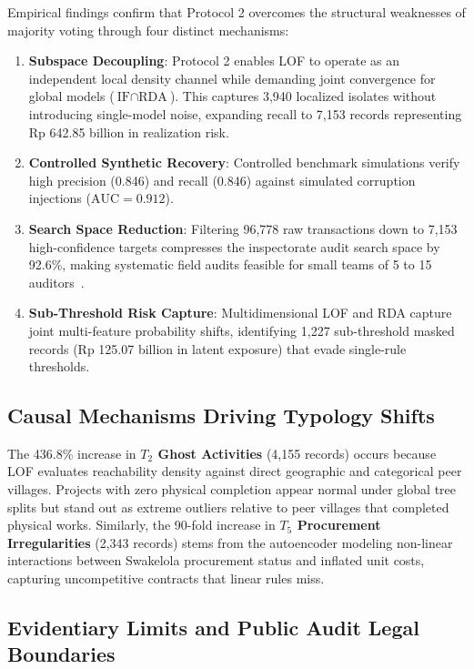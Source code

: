 \documentclass[conference]{IEEEtran}
\begin{document}
Empirical findings confirm that Protocol 2 overcomes the structural weaknesses of majority voting through four distinct mechanisms:
\begin{enumerate}
    \item \textbf{Subspace Decoupling}: Protocol 2 enables LOF to operate as an independent local density channel while demanding joint convergence for global models ($\text{IF} \cap \text{RDA}$). This captures 3,940 localized isolates without introducing single-model noise, expanding recall to 7,153 records representing Rp 642.85 billion in realization risk.
    \item \textbf{Controlled Synthetic Recovery}: Controlled benchmark simulations verify high precision (0.846) and recall (0.846) against simulated corruption injections ($\text{AUC} = 0.912$).
    \item \textbf{Search Space Reduction}: Filtering 96,778 raw transactions down to 7,153 high-confidence targets compresses the inspectorate audit search space by 92.6\%, making systematic field audits feasible for small teams of 5 to 15 auditors~\cite{ref12}.
    \item \textbf{Sub-Threshold Risk Capture}: Multidimensional LOF and RDA capture joint multi-feature probability shifts, identifying 1,227 sub-threshold masked records (Rp 125.07 billion in latent exposure) that evade single-rule thresholds.
\end{enumerate}

\subsection{Causal Mechanisms Driving Typology Shifts}

The 436.8\% increase in \textbf{$T_2$ Ghost Activities} (4,155 records) occurs because LOF evaluates reachability density against direct geographic and categorical peer villages. Projects with zero physical completion appear normal under global tree splits but stand out as extreme outliers relative to peer villages that completed physical works. Similarly, the 90-fold increase in \textbf{$T_5$ Procurement Irregularities} (2,343 records) stems from the autoencoder modeling non-linear interactions between Swakelola procurement status and inflated unit costs, capturing uncompetitive contracts that linear rules miss.

\subsection{Evidentiary Limits and Public Audit Legal Boundaries}
\end{document}
